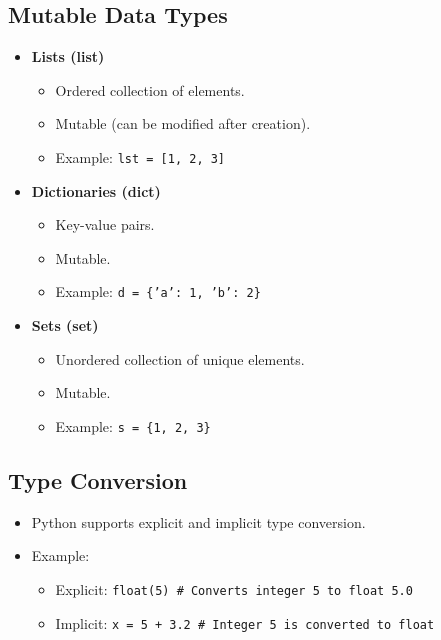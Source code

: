 \documentclass{article}
\begin{document}
\subsection{Mutable Data Types}
\begin{itemize}
    \item \textbf{Lists (list)}
    \begin{itemize}
        \item Ordered collection of elements.
        \item Mutable (can be modified after creation).
        \item Example: \texttt{lst = [1, 2, 3]}
    \end{itemize}
    \item \textbf{Dictionaries (dict)}
    \begin{itemize}
        \item Key-value pairs.
        \item Mutable.
        \item Example: \texttt{d = \{'a': 1, 'b': 2\}}
    \end{itemize}
    \item \textbf{Sets (set)}
    \begin{itemize}
        \item Unordered collection of unique elements.
        \item Mutable.
        \item Example: \texttt{s = \{1, 2, 3\}}
    \end{itemize}
\end{itemize}

\subsection{Type Conversion}
\begin{itemize}
    \item Python supports explicit and implicit type conversion.
    \item Example:
    \begin{itemize}
        \item Explicit: \texttt{float(5) \# Converts integer 5 to float 5.0}
        \item Implicit: \texttt{x = 5 + 3.2 \# Integer 5 is converted to float}
    \end{itemize}
\end{itemize}
\end{document}

